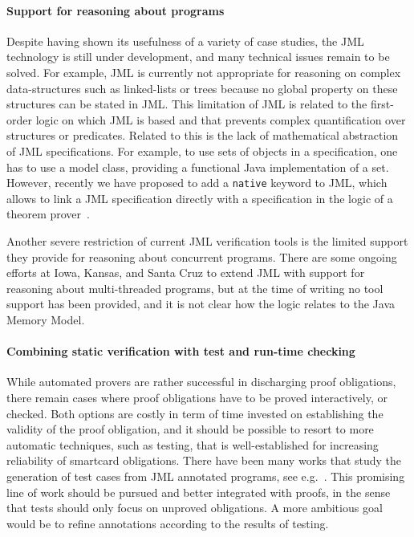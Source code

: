 \paragraph{Support for reasoning about programs}
Despite having shown its usefulness of a variety of case studies, the
JML technology is still under development, and many technical issues
remain to be solved. For example, JML is currently not appropriate for
reasoning on complex data-structures such as linked-lists or trees
because no global property on these structures can be stated in JML.
This limitation of JML is related to the first-order logic on which
JML is based and that prevents complex quantification over structures
or predicates. Related to this is the lack of mathematical abstraction
of JML specifications. For example, to use sets of objects in a
specification, one has to use a model class, providing a functional Java
implementation of a set. However, recently we have proposed to add a
\texttt{native} keyword to JML, which allows to link a JML
specification directly with a specification in the logic of a theorem
prover~\cite{Charles06}. 

Another severe restriction of current JML verification
tools is the limited support they provide for reasoning about
concurrent programs.  There are some ongoing efforts at Iowa, Kansas,
and Santa Cruz to extend JML with support for reasoning about
multi-threaded programs, but at the time of writing no tool support
has been provided, and it is not clear how the logic relates to the
Java Memory Model.



\paragraph{Combining static verification with test and run-time checking}
While automated provers are rather successful in discharging proof
obligations, there remain cases where proof obligations have to be
proved interactively, or checked. Both options are costly in term of
time invested on establishing the validity of the proof obligation,
and it should be possible to resort to more automatic techniques, such
as testing, that is well-established for increasing reliability of
smartcard obligations. There have been many works that study the
generation of test cases from JML annotated programs, see
e.g.~\cite{jll04:ase}. This promising line of work should be pursued
and better integrated with proofs, in the sense that tests should only
focus on unproved obligations. A more ambitious goal would be to refine
annotations according to the results of testing.


